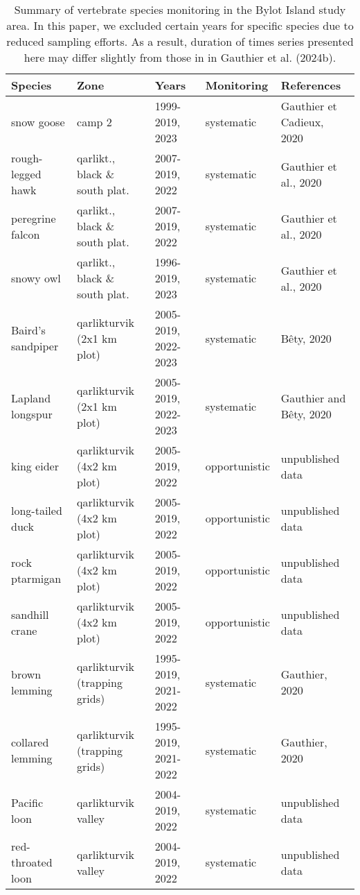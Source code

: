 \begin{table}[ht]
\centering
\caption{Summary of vertebrate species monitoring in the Bylot Island study area. In this paper, we excluded certain years for specific species due to reduced sampling efforts. As a result, duration of times series presented here may differ slightly from those in in Gauthier et al. (2024b).} 
\label{table:species_year_monitoring}
\begingroup\fontsize{8pt}{10pt}\selectfont
\begin{tabularx}{\textwidth}{lllll}
  \hline
Species & Zone & Years & Monitoring & References \\ 
  \hline
snow goose & camp 2 & 1999-2019, 2023 & systematic & Gauthier et Cadieux, 2020 \\ 
  rough-legged hawk & qarlikt., black \& south plat. & 2007-2019, 2022 & systematic & Gauthier et al., 2020 \\ 
  peregrine falcon & qarlikt., black \& south plat. & 2007-2019, 2022 & systematic & Gauthier et al., 2020 \\ 
  snowy owl & qarlikt., black \& south plat. & 1996-2019, 2023 & systematic & Gauthier et al., 2020 \\ 
  Baird's sandpiper & qarlikturvik (2x1 km plot) & 2005-2019, 2022-2023 & systematic & Bêty, 2020 \\ 
  Lapland longspur & qarlikturvik (2x1 km plot) & 2005-2019, 2022-2023 & systematic & Gauthier and Bêty, 2020 \\ 
  king eider & qarlikturvik (4x2 km plot) & 2005-2019, 2022 & opportunistic & unpublished data \\ 
  long-tailed duck & qarlikturvik (4x2 km plot) & 2005-2019, 2022 & opportunistic & unpublished data \\ 
  rock ptarmigan & qarlikturvik (4x2 km plot) & 2005-2019, 2022 & opportunistic & unpublished data \\ 
  sandhill crane & qarlikturvik (4x2 km plot) & 2005-2019, 2022 & opportunistic & unpublished data \\ 
  brown lemming & qarlikturvik (trapping grids) & 1995-2019, 2021-2022 & systematic & Gauthier, 2020 \\ 
  collared lemming & qarlikturvik (trapping grids) & 1995-2019, 2021-2022 & systematic & Gauthier, 2020 \\ 
  Pacific loon & qarlikturvik valley & 2004-2019, 2022 & systematic & unpublished data \\ 
  red-throated loon & qarlikturvik valley & 2004-2019, 2022 & systematic & unpublished data \\ 

\end{tabularx}
\end{table}
